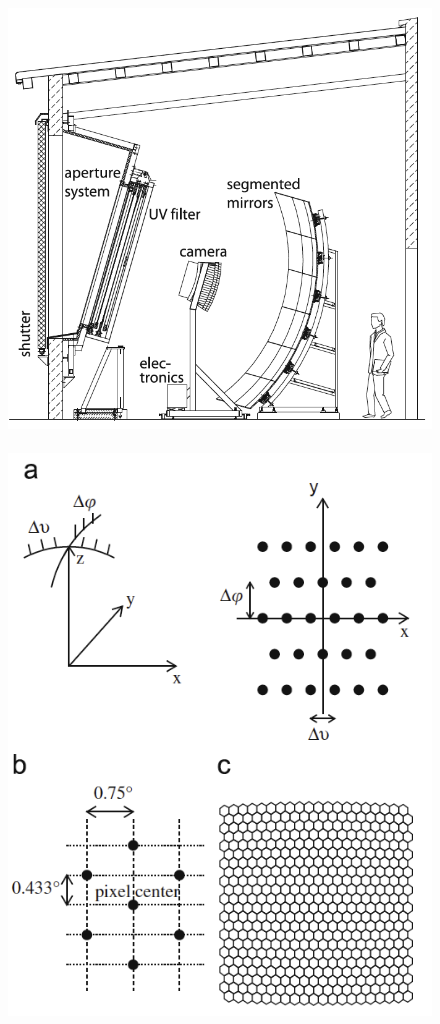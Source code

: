 \documentclass[12pt,oneside,openany,letter]{book}
\begin{document}
\begin{figure}
    \includegraphics[scale=0.35]{figures/telescope_scheme.png} \,\,\, \includegraphics[scale=0.35]{figures/camera.png}

\end{figure}
\end{document}
